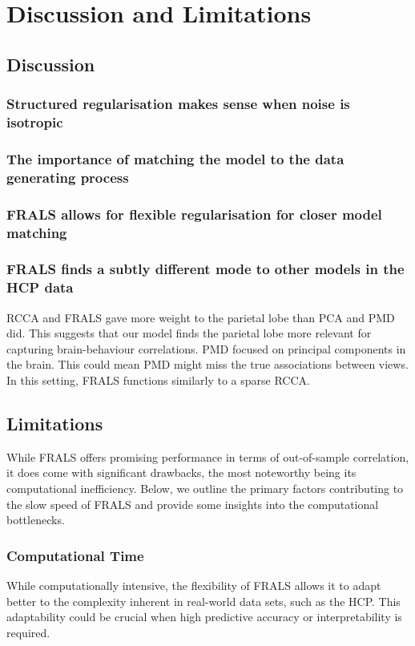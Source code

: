 \section{Discussion and Limitations}

\subsection{Discussion}

\subsubsection{Structured regularisation makes sense when noise is isotropic}

\subsubsection{The importance of matching the model to the data generating process}

\subsubsection{FRALS allows for flexible regularisation for closer model matching}

\subsubsection{FRALS finds a subtly different mode to other models in the HCP data}

RCCA and FRALS gave more weight to the parietal lobe than PCA and PMD did.
This suggests that our model finds the parietal lobe more relevant for capturing brain-behaviour correlations.
PMD focused on principal components in the brain.
This could mean PMD might miss the true associations between views.
In this setting, FRALS functions similarly to a sparse RCCA.

\subsection{Limitations}
While FRALS offers promising performance in terms of out-of-sample correlation, it does come with significant drawbacks, the most noteworthy being its computational inefficiency.
Below, we outline the primary factors contributing to the slow speed of FRALS and provide some insights into the computational bottlenecks.

\subsubsection{Computational Time}\label{subsec:computational-time}
While computationally intensive, the flexibility of FRALS allows it to adapt better to the complexity inherent in real-world data sets, such as the HCP. This adaptability could be crucial when high predictive accuracy or interpretability is required.

